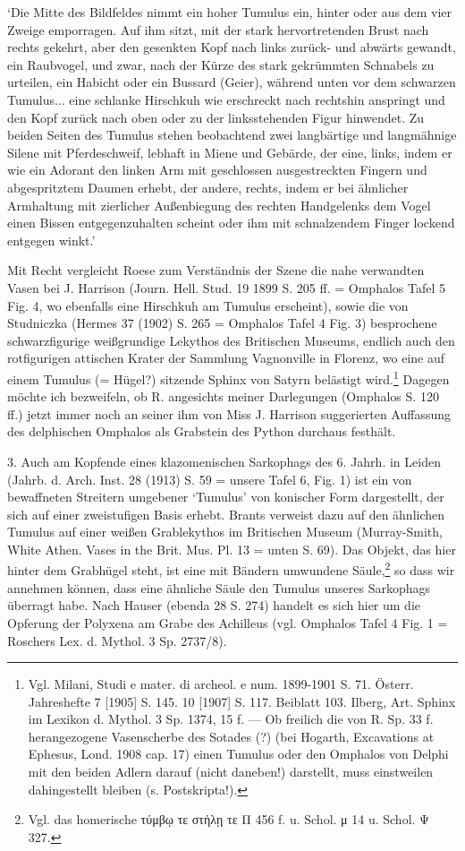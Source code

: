 \documentclass[a4paper, 11pt, oneside]{article}
\begin{document}
`Die Mitte des Bildfeldes nimmt ein hoher Tumulus ein, hinter oder aus dem vier Zweige emporragen. Auf ihm sitzt, mit der stark hervortretenden Brust nach rechts gekehrt, aber den gesenkten Kopf nach links zurück- und abwärts gewandt, ein Raubvogel, und zwar, nach der Kürze des stark gekrümmten Schnabels zu urteilen, ein Habicht oder ein Bussard (Geier), während unten vor dem schwarzen Tumulus... eine schlanke Hirschkuh wie erschreckt nach rechtshin anspringt und den Kopf zurück nach oben oder zu der linksstehenden Figur hinwendet. Zu beiden Seiten des Tumulus stehen beobachtend zwei langbärtige und langmähnige Silene mit Pferdeschweif, lebhaft in Miene und Gebärde, der eine, links, indem er wie ein Adorant den linken Arm mit geschlossen ausgestreckten Fingern und abgespritztem Daumen erhebt, der andere, rechts, indem er bei ähnlicher Armhaltung mit zierlicher Außenbiegung des rechten Handgelenks dem Vogel einen Bissen entgegenzuhalten scheint oder ihm mit schnalzendem Finger lockend entgegen winkt.'

Mit Recht vergleicht Roese zum Verständnis der Szene die nahe verwandten Vasen bei J. Harrison (Journ. Hell. Stud. 19 1899 S. 205 ff. = Omphalos Tafel 5 Fig. 4, wo ebenfalls eine Hirschkuh am Tumulus erscheint), sowie die von Studniczka (Hermes 37 (1902) S. 265 = Omphalos Tafel 4 Fig. 3) besprochene schwarzfigurige weißgrundige Lekythos des Britischen Museums, endlich auch den rotfigurigen attischen Krater der Sammlung Vagnonville in Florenz, wo eine auf einem Tumulus (= Hügel?) sitzende Sphinx von Satyrn belästigt wird.\footnote{Vgl. Milani, Studi e mater. di archeol. e num. 1899-1901 S. 71. Österr. Jahreshefte 7 [1905] S. 145. 10 [1907] S. 117. Beiblatt 103. Ilberg, Art. Sphinx im Lexikon d. Mythol. 3 Sp. 1374, 15 f. --- Ob freilich die von R. Sp. 33 f. herangezogene Vasenscherbe des Sotades (?) (bei Hogarth, Excavations at Ephesus, Lond. 1908 cap. 17) einen Tumulus oder den Omphalos von Delphi mit den beiden Adlern darauf (nicht daneben!) darstellt, muss einstweilen dahingestellt bleiben (s. Postskripta!).} Dagegen möchte ich bezweifeln, ob R. angesichts meiner Darlegungen (Omphalos S. 120 ff.) jetzt immer noch an seiner ihm von Miss J. Harrison suggerierten Auffassung des delphischen Omphalos als Grabstein des Python durchaus festhält.

3. Auch am Kopfende eines klazomenischen Sarkophags des 6. Jahrh. in Leiden (Jahrb. d. Arch. Inst. 28 (1913) S. 59 = unsere Tafel 6, Fig. 1) ist ein von bewaffneten Streitern umgebener `Tumulus' von konischer Form dargestellt, der sich auf einer zweistufigen Basis erhebt. Brants verweist dazu auf den ähnlichen Tumulus auf einer weißen Grablekythos im Britischen Museum (Murray-Smith, White Athen. Vases in the Brit. Mus. Pl. 13 = unten S. 69). Das Objekt, das hier hinter dem Grabhügel steht, ist eine mit Bändern umwundene Säule,\footnote{Vgl. das homerische τύμβῳ τε στήλῃ τε Π 456 f. u. Schol. μ 14 u. Schol. Ψ 327.} so dass wir annehmen können, dass eine ähnliche Säule den Tumulus unseres Sarkophags überragt habe. Nach Hauser (ebenda 28 S. 274) handelt es sich hier um die Opferung der Polyxena am Grabe des Achilleus (vgl. Omphalos Tafel 4 Fig. 1 = Roschers Lex. d. Mythol. 3 Sp. 2737/8).
\end{document}
